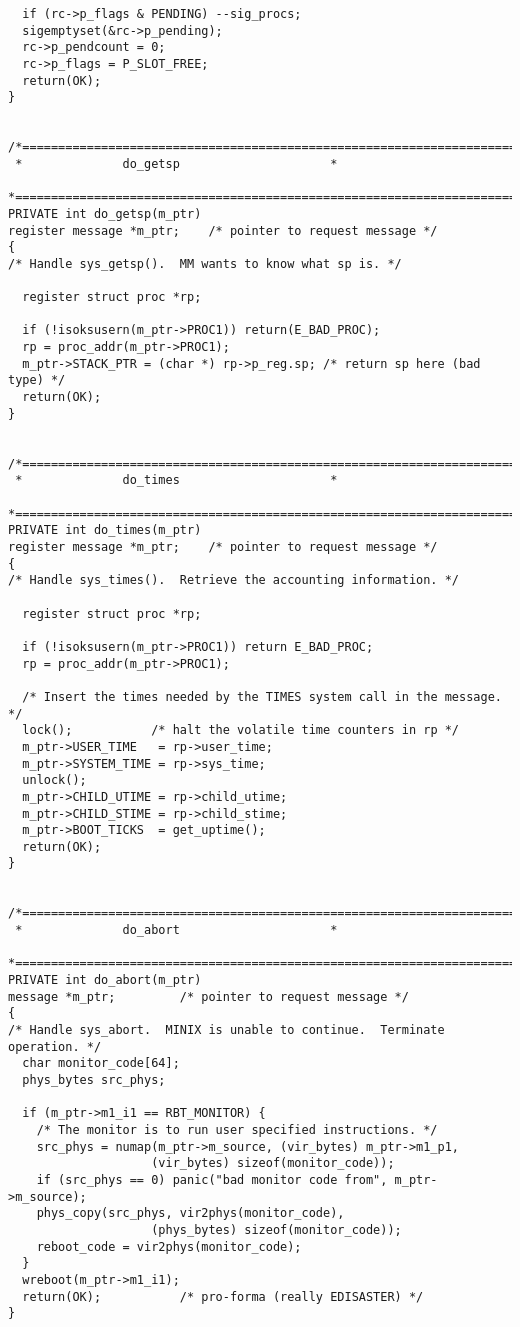 \begin{verbatim}
  if (rc->p_flags & PENDING) --sig_procs;
  sigemptyset(&rc->p_pending);
  rc->p_pendcount = 0;
  rc->p_flags = P_SLOT_FREE;
  return(OK);
}


/*===========================================================================*
 *				do_getsp				     *
 *===========================================================================*/
PRIVATE int do_getsp(m_ptr)
register message *m_ptr;	/* pointer to request message */
{
/* Handle sys_getsp().  MM wants to know what sp is. */

  register struct proc *rp;

  if (!isoksusern(m_ptr->PROC1)) return(E_BAD_PROC);
  rp = proc_addr(m_ptr->PROC1);
  m_ptr->STACK_PTR = (char *) rp->p_reg.sp;	/* return sp here (bad type) */
  return(OK);
}


/*===========================================================================*
 *				do_times				     *
 *===========================================================================*/
PRIVATE int do_times(m_ptr)
register message *m_ptr;	/* pointer to request message */
{
/* Handle sys_times().  Retrieve the accounting information. */

  register struct proc *rp;

  if (!isoksusern(m_ptr->PROC1)) return E_BAD_PROC;
  rp = proc_addr(m_ptr->PROC1);

  /* Insert the times needed by the TIMES system call in the message. */
  lock();			/* halt the volatile time counters in rp */
  m_ptr->USER_TIME   = rp->user_time;
  m_ptr->SYSTEM_TIME = rp->sys_time;
  unlock();
  m_ptr->CHILD_UTIME = rp->child_utime;
  m_ptr->CHILD_STIME = rp->child_stime;
  m_ptr->BOOT_TICKS  = get_uptime();
  return(OK);
}


/*===========================================================================*
 *				do_abort				     *
 *===========================================================================*/
PRIVATE int do_abort(m_ptr)
message *m_ptr;			/* pointer to request message */
{
/* Handle sys_abort.  MINIX is unable to continue.  Terminate operation. */
  char monitor_code[64];
  phys_bytes src_phys;

  if (m_ptr->m1_i1 == RBT_MONITOR) {
	/* The monitor is to run user specified instructions. */
	src_phys = numap(m_ptr->m_source, (vir_bytes) m_ptr->m1_p1,
					(vir_bytes) sizeof(monitor_code));
	if (src_phys == 0) panic("bad monitor code from", m_ptr->m_source);
	phys_copy(src_phys, vir2phys(monitor_code),
					(phys_bytes) sizeof(monitor_code));
	reboot_code = vir2phys(monitor_code);
  }
  wreboot(m_ptr->m1_i1);
  return(OK);			/* pro-forma (really EDISASTER) */
}



\end{verbatim}
